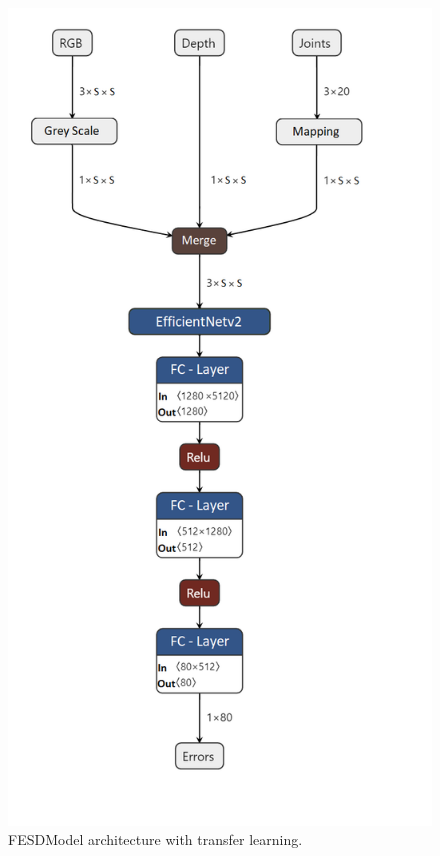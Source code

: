 \begin{figure}[h]
  \centering
  \includegraphics[width=\linewidth]{figures/Model/FESDv2.png}
  \caption[FESDModel architecture version 2]{FESDModel architecture with transfer learning.}
  \label{fig:model_architecture_v1}
\end{figure}

